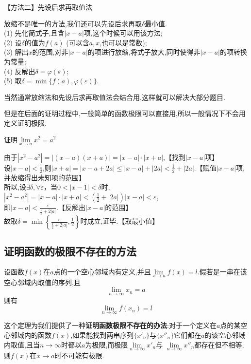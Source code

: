 \noindent 【方法二】先设后求再取值法\vspace{0.8em}
\par 放缩不是唯一的方法,我们还可以先设后求再取$\delta $最小值.\\[0.5em]
\noindent (1)  先化简式子,且含$|x-a|$项,这个时候可以用该方法;\\[0.5em]
\noindent (2)  设$\delta $的值为$f(a)$ (可以含$a,x$,也可以是常数);\\[0.5em]
\noindent (3)  解出$x$的范围,对非$|x - a|$的项进行放缩,将式子放大,同时使得非$|x - a|$的项转换为常量;\\[0.5em]
\noindent (4)  反解出$\delta = \varphi (\varepsilon)$;\\[0.5em]
\noindent (5)  取$\delta = \min \lbrace f(a),\varphi(\varepsilon)\rbrace$.\vspace{0.5em}
\par 当然通常放缩法和先设后求再取值法会结合用,这样就可以解决大部分题目.\vspace{0.5em}
\par 但是在后面的证明过程中,一般简单的函数极限可以直接用,所以一般情况下不会用定义证明极限.

\examples 证明$\lim\limits_{x \to a}x^2=a^2$

\proof 由于$|x^2-a^2|=|(x-a)(x+a)|=|x-a|\cdot |x+a| $,\hspace{15em}【找到$|x-a|$项】\\[0.5em]
设$\displaystyle |x-a|<\frac{1}{2}$,则$\displaystyle |x+a|=|x-a+2a|\le |x-a|+|2a|<\frac{1}{2}+|2a|.$【赋值$|x-a|$项,并放缩得出未知项的范围】\\[0.5em]
所以,设$\exists \delta,\forall \varepsilon$，当$0<|x-1|<\delta $时,$\displaystyle |x^2-a^2|=|x-a|\cdot |x+a|<\left( \frac{1}{2}+|2a|\right)|x-a|<\varepsilon $,\\[0.5em]
即$\displaystyle|x-a|<\frac{\varepsilon}{\frac{1}{2}+2|a|}$.\hspace{28em}【反解出$|x-a|$的范围】\\[0.5em]
故取$\displaystyle \delta = \min \left\lbrace  \frac{\varepsilon}{\frac{1}{2}+2|a|},\frac{1}{2} \right\rbrace $时成立,证毕.\hspace{24.5em}【取最小值】\\

\subsection{证明函数的极限不存在的方法}
\ttheorem[序列极限]
设函数$f (x)$在$a$点的一个空心邻域内有定义,并且$\lim\limits_{x \to a}f(x)=l$.假若是一串在该空心邻域内取值的序列,且
\begin{equation*}
\lim\limits_{n \to \infty}x_n=a
\end{equation*}
则有
\begin{equation}
\lim\limits_{n \to \infty}f(x_n)=l
\end{equation}
\par 这个定理为我们提供了一种\textbf{证明函数极限不存在的办法}:对于一个定义在$a$点的某空心邻域内的函数$f(x)$,如果能找到两串序列$\lbrace x'_n \rbrace $与$\lbrace x''_n\rbrace$它们都在$a$的该空心邻域内取值,且当$n\to \infty $时都以$a$为极限,而极限$\lim\limits_{n \to \infty }x'_n$与 $\lim\limits_{n \to \infty }x''_n$都存在但不相等,则$f(x)$在$x \to a$时不可能有极限.\jg

